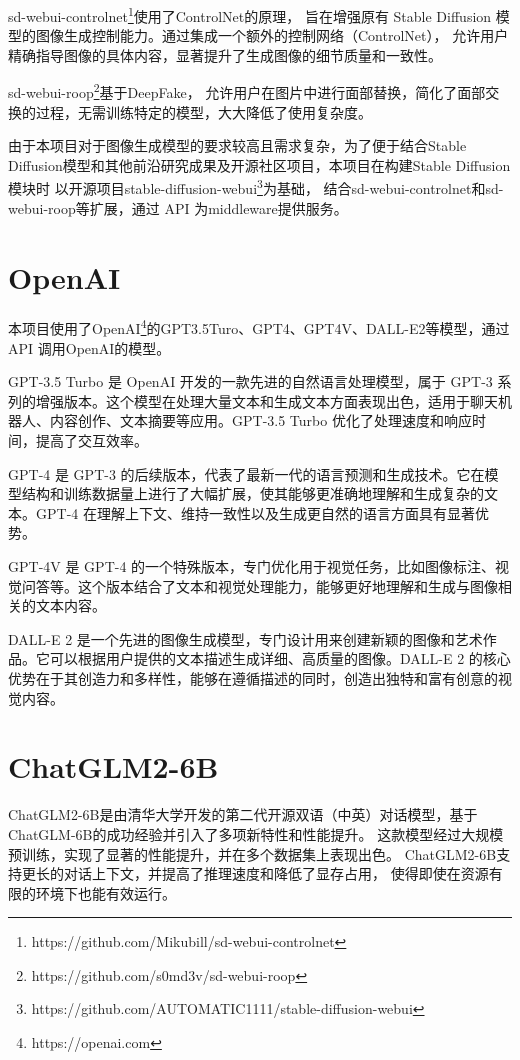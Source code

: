 \documentclass[a4paper,AutoFakeBold,oneside,12pt]{book}
\begin{document}
sd-webui-controlnet\footnote{https://github.com/Mikubill/sd-webui-controlnet}使用了ControlNet\cite{zhang2023adding}的原理，
旨在增强原有 Stable Diffusion 模型的图像生成控制能力。通过集成一个额外的控制网络（ControlNet），
允许用户精确指导图像的具体内容，显著提升了生成图像的细节质量和一致性。

sd-webui-roop\footnote{https://github.com/s0md3v/sd-webui-roop}基于DeepFake\cite{van2021deepfake}，
允许用户在图片中进行面部替换，简化了面部交换的过程，无需训练特定的模型，大大降低了使用复杂度。

由于本项目对于图像生成模型的要求较高且需求复杂，为了便于结合Stable Diffusion模型和其他前沿研究成果及开源社区项目，本项目在构建Stable Diffusion模块时
以开源项目stable-diffusion-webui\footnote{https://github.com/AUTOMATIC1111/stable-diffusion-webui}为基础，
结合sd-webui-controlnet和sd-webui-roop等扩展，通过 API 为middleware提供服务。

\section{OpenAI}
本项目使用了OpenAI\footnote{https://openai.com}的GPT3.5Turo、GPT4、GPT4V、DALL-E2等模型，通过 API 调用OpenAI的模型。

GPT-3.5 Turbo 是 OpenAI 开发的一款先进的自然语言处理模型，属于 GPT-3 系列的增强版本。这个模型在处理大量文本和生成文本方面表现出色，适用于聊天机器人、内容创作、文本摘要等应用。GPT-3.5 Turbo 优化了处理速度和响应时间，提高了交互效率。

GPT-4 是 GPT-3 的后续版本，代表了最新一代的语言预测和生成技术。它在模型结构和训练数据量上进行了大幅扩展，使其能够更准确地理解和生成复杂的文本。GPT-4 在理解上下文、维持一致性以及生成更自然的语言方面具有显著优势。

GPT-4V 是 GPT-4 的一个特殊版本，专门优化用于视觉任务，比如图像标注、视觉问答等。这个版本结合了文本和视觉处理能力，能够更好地理解和生成与图像相关的文本内容。

DALL-E 2 是一个先进的图像生成模型，专门设计用来创建新颖的图像和艺术作品。它可以根据用户提供的文本描述生成详细、高质量的图像。DALL-E 2 的核心优势在于其创造力和多样性，能够在遵循描述的同时，创造出独特和富有创意的视觉内容。

\section{ChatGLM2-6B}
ChatGLM2-6B是由清华大学开发的第二代开源双语（中英）对话模型，基于ChatGLM-6B的成功经验并引入了多项新特性和性能提升。
这款模型经过大规模预训练，实现了显著的性能提升，并在多个数据集上表现出色。
ChatGLM2-6B支持更长的对话上下文，并提高了推理速度和降低了显存占用，
使得即使在资源有限的环境下也能有效运行。
\end{document}

